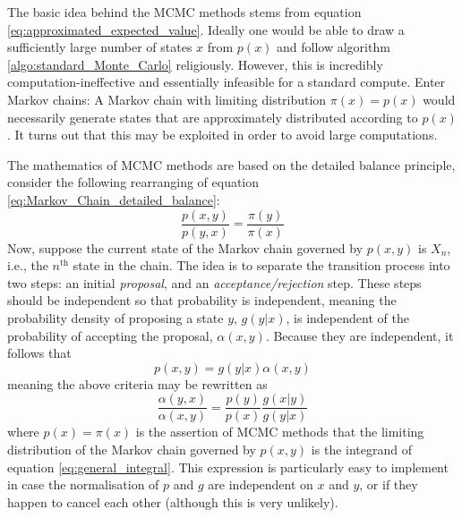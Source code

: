 \documentclass[nofootinbib,reprint,english]{revtex4-1}
\begin{document}
The basic idea behind the MCMC methods stems from equation \eqref{eq:approximated_expected_value}. Ideally one would be able to draw a sufficiently large number of states \(x\) from \(p(x)\) and follow algorithm \ref{algo:standard_Monte_Carlo} religiously. However, this is incredibly computation-ineffective and essentially infeasible for a standard compute. Enter Markov chains: A Markov chain with limiting distribution \(\pi(x)=p(x)\) would necessarily generate states that are approximately distributed according to \(p(x)\). It turns out that this may be exploited in order to avoid large computations.

The mathematics of MCMC methods are based on the detailed balance principle, consider the following rearranging of equation \eqref{eq:Markov_Chain_detailed_balance}:
\[\frac{p(x,y)}{p(y,x)}=\frac{\pi(y)}{\pi(x)}\]
Now, suppose the current state of the Markov chain governed by \(p(x,y)\) is \(X_n\), i.e., the \(n^\text{th}\) state in the chain. The idea is to separate the transition process into two steps: an initial \emph{proposal}, and an \emph{acceptance/rejection} step. These steps should be independent so that probability is independent, meaning the probability density of proposing a state \(y\), \(g(y|x)\), is independent of the probability of accepting the proposal, \(\alpha(x,y)\). Because they are independent, it follows that
\begin{equation}
p(x,y)=g(y|x)\alpha(x,y)
\end{equation}
meaning the above criteria may be rewritten as
\begin{equation}\label{eq:MCMC_detailed_balance_with_TandA}
\frac{\alpha(y,x)}{\alpha(x,y)}=\frac{p(y)}{p(x)}\frac{g(x|y)}{g(y|x)}
\end{equation}
where \(p(x)=\pi(x)\) is the assertion of MCMC methods that the limiting distribution of the Markov chain governed by \(p(x,y)\) is the integrand of equation \eqref{eq:general_integral}. This expression is particularly easy to implement in case the normalisation of \(p\) and \(g\) are independent on \(x\) and \(y\), or if they happen to cancel each other (although this is very unlikely).
\end{document}
